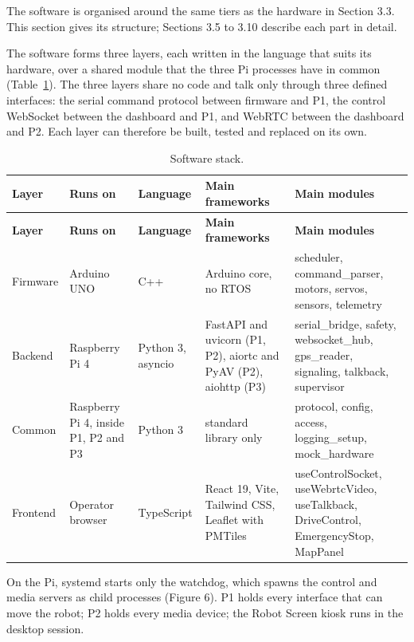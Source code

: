 The software is organised around the same tiers as the hardware in Section 3.3. This section gives its structure; Sections 3.5 to 3.10 describe each part in detail.

The software forms three layers, each written in the language that suits its hardware, over a shared module that the three Pi processes have in common (Table~\ref{tab:software-stack}). The three layers share no code and talk only through three defined interfaces: the serial command protocol between firmware and P1, the control WebSocket between the dashboard and P1, and WebRTC between the dashboard and P2. Each layer can therefore be built, tested and replaced on its own.

\begin{center}
\begin{longtable}{|p{2cm}|p{2.5cm}|p{1.8cm}|p{3.5cm}|p{3.5cm}|}
\caption{Software stack.}
\label{tab:software-stack} \\
\hline
\textbf{Layer} & \textbf{Runs on} & \textbf{Language} & \textbf{Main frameworks} & \textbf{Main modules} \\
\hline
\endfirsthead
\hline
\textbf{Layer} & \textbf{Runs on} & \textbf{Language} & \textbf{Main frameworks} & \textbf{Main modules} \\
\hline
\endhead
Firmware & Arduino UNO & C++ & Arduino core, no RTOS & scheduler, command\_parser, motors, servos, sensors, telemetry \\
\hline
Backend & Raspberry Pi 4 & Python 3, asyncio & FastAPI and uvicorn (P1, P2), aiortc and PyAV (P2), aiohttp (P3) & serial\_bridge, safety, websocket\_hub, gps\_reader, signaling, talkback, supervisor \\
\hline
Common & Raspberry Pi 4, inside P1, P2 and P3 & Python 3 & standard library only & protocol, config, access, logging\_setup, mock\_hardware \\
\hline
Frontend & Operator browser & TypeScript & React 19, Vite, Tailwind CSS, Leaflet with PMTiles & useControlSocket, useWebrtcVideo, useTalkback, DriveControl, EmergencyStop, MapPanel \\
\hline
\end{longtable}
\end{center}

On the Pi, systemd starts only the watchdog, which spawns the control and media servers as child processes (Figure 6). P1 holds every interface that can move the robot; P2 holds every media device; the Robot Screen kiosk runs in the desktop session.

